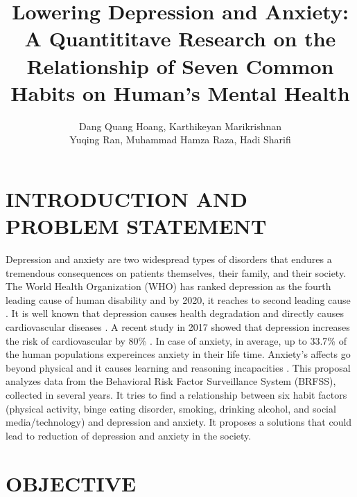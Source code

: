 \documentclass[letterpaper, 10 pt, conference]{ieeeconf}  %
\title{\LARGE \bf
Lowering Depression and Anxiety: A Quantititave Research on the Relationship of Seven Common Habits 
on Human's Mental Health
}
\author{Dang Quang Hoang, Karthikeyan Marikrishnan \\ Yuqing Ran, Muhammad Hamza Raza, Hadi Sharifi}
\begin{document}
\maketitle
\thispagestyle{empty}
\pagestyle{empty}






\section{INTRODUCTION AND PROBLEM STATEMENT}
Depression and anxiety are two widespread types of disorders that endures a tremendous consequences on
patients themselves, their family, and their society. 
The World Health Organization (WHO) has ranked depression as the fourth leading cause of human disability 
and by 2020, it reaches to second leading cause \cite{kessler2013epidemiology}. It is well known that depression causes health 
degradation \cite{verma2017impact} and directly causes cardiovascular diseases \cite{bradley2015depression}. 
A recent study in 2017 showed that depression 
increases the risk of cardiovascular by 80\% \cite{penninx2017depression}. In case of anxiety, in average, up to 33.7\% of 
the human populations expereinces anxiety \cite{bandelow2015epidemiology} in their life time. Anxiety's affects go beyond physical
and it causes learning and reasoning incapacities \cite{spielberger2013effects}\cite{darke1988effects}. 
This proposal analyzes data from the Behavioral Risk Factor Surveillance System (BRFSS), collected in several years. 
It tries to find a relationship between six habit factors (physical activity, binge eating disorder, 
smoking, drinking alcohol, and social media/technology) and depression and anxiety. It proposes a
solutions that could lead to reduction of depression and anxiety in the society. 

\section{OBJECTIVE}
\end{document}
